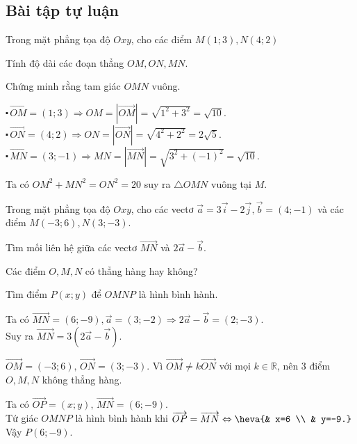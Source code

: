 \subsection{Bài tập tự luận}
\begin{bt}
Trong mặt phẳng tọa độ $Oxy$, cho các điểm $M(1;3), N(4;2)$
\begin{listEX}[1]
	\item Tính độ dài các đoạn thẳng $OM, ON, MN$.
	\item Chứng minh rằng tam giác $OMN$ vuông.
\end{listEX}
	\loigiai
	{
	\begin{listEX}[1]
		\item  $\centerdot \, \overrightarrow{OM}=(1;3)\Rightarrow OM=|\overrightarrow{OM}|=\sqrt{1^2+3^2}=\sqrt{10}$.\\
	 $\centerdot \, \overrightarrow{ON}=(4;2)\Rightarrow ON=|\overrightarrow{ON}|=\sqrt{4^2+2^2}=2\sqrt{5}$.\\
	  $\centerdot\, \overrightarrow{MN}=(3;-1)\Rightarrow MN=|\overrightarrow{MN}|=\sqrt{3^2+(-1)^2}=\sqrt{10}$.
		\item  Ta có $OM^2+MN^2=ON^2=20$ suy ra $\triangle OMN$ vuông tại $M$.
\end{listEX}
	}
\end{bt}
\begin{bt}
	Trong mặt phẳng tọa độ $Oxy$, cho các vectơ $\overrightarrow{a}=3\overrightarrow{i}-2\overrightarrow{j}, \overrightarrow{b}=(4;-1)$ và các điểm $M(-3;6), N(3;-3)$.
	\begin{listEX}[1]
		\item Tìm mối liên hệ giữa các vectơ $\overrightarrow{MN}$ và $2\overrightarrow{a}-\overrightarrow{b}$.
		\item Các điểm $O,M,N$ có thẳng hàng hay không?
		\item Tìm điểm $P(x;y)$ để $OMNP$ là hình bình hành.
	\end{listEX}
	\loigiai
	{
		\begin{listEX}[1]
			\item Ta có $\overrightarrow{MN}=(6;-9), 
			 \overrightarrow{a}=(3;-2)\Rightarrow 2\overrightarrow{a}-\overrightarrow{b}=(2;-3)$.\\
			 Suy ra $\overrightarrow{MN} =3(2\overrightarrow{a}-\overrightarrow{b})$.
			\item $\overrightarrow{OM} =(-3;6),\, \overrightarrow{ON}=(3;-3)$. Vì $\overrightarrow{OM}\ne k\overrightarrow{ON}$ với mọi $k\in\mathbb{R}$, nên 3 điểm $O,M,N$ không thẳng hàng.
			\item Ta có $\overrightarrow{OP}=(x;y),\, \overrightarrow{MN}=(6;-9)$.\\ Tứ giác $OMNP$ là hình bình hành khi $\overrightarrow{OP}=\overrightarrow{MN}\Leftrightarrow \heva{& x=6 \\ & y=-9.}$\\
			Vậy $P(6;-9)$.
		\end{listEX}
	}
\end{bt}
